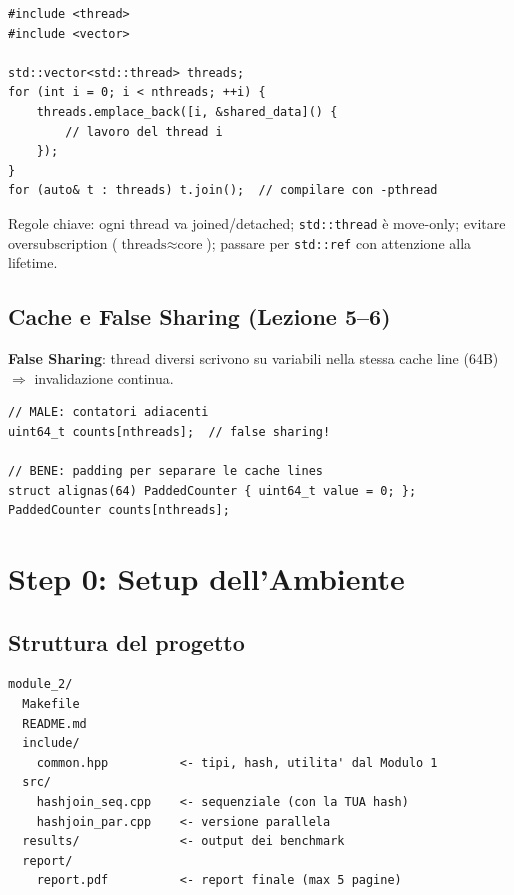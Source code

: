 \documentclass[11pt,a4paper]{article}
\begin{document}
\begin{lstlisting}[style=cpp,caption={Pattern base spawn/join}]
#include <thread>
#include <vector>

std::vector<std::thread> threads;
for (int i = 0; i < nthreads; ++i) {
    threads.emplace_back([i, &shared_data]() {
        // lavoro del thread i
    });
}
for (auto& t : threads) t.join();  // compilare con -pthread
\end{lstlisting}

Regole chiave: ogni thread va joined/detached; \texttt{std::thread} è move-only; evitare oversubscription ($\text{threads} \approx \text{core}$); passare per \texttt{std::ref} con attenzione alla lifetime.

\subsection{Cache e False Sharing (Lezione 5--6)}

\textbf{False Sharing}: thread diversi scrivono su variabili nella stessa cache line (64B) $\Rightarrow$ invalidazione continua.

\begin{lstlisting}[style=cpp,caption={Evitare false sharing con padding}]
// MALE: contatori adiacenti
uint64_t counts[nthreads];  // false sharing!

// BENE: padding per separare le cache lines
struct alignas(64) PaddedCounter { uint64_t value = 0; };
PaddedCounter counts[nthreads];
\end{lstlisting}


\clearpage
\section{Step 0: Setup dell'Ambiente}

\subsection{Struttura del progetto}

\begin{lstlisting}[style=plain]
module_2/
  Makefile
  README.md
  include/
    common.hpp          <- tipi, hash, utilita' dal Modulo 1
  src/
    hashjoin_seq.cpp    <- sequenziale (con la TUA hash)
    hashjoin_par.cpp    <- versione parallela
  results/              <- output dei benchmark
  report/
    report.pdf          <- report finale (max 5 pagine)
\end{lstlisting}
\end{document}

